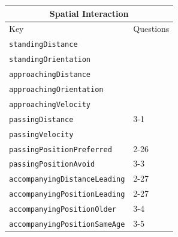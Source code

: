 \documentclass{CSSRforAfrica}
\begin{document}
\begin{table}[H]
\begin{center}
\begin{tabular}{|l l|}
\hline \hline
\multicolumn{2}{|c|}{{\small \bf Spatial Interaction}} \\
\hline \hline
 {\small Key  }                                         &  {\small  Questions }      \\
\hline
{\footnotesize \verb+standingDistance+} 	           &{\footnotesize \verb++} \vspace{-1mm}\\
{\footnotesize \verb+standingOrientation+} 	           &  {\footnotesize \verb++} \vspace{-1mm}\\
{\footnotesize \verb+approachingDistance+} 	   &  {\footnotesize \verb++} \vspace{-1mm}\\
{\footnotesize \verb+approachingOrientation+} 	   & {\footnotesize \verb++} \vspace{-1mm}\\
{\footnotesize \verb+approachingVelocity+} 	           & {\footnotesize \verb++} \vspace{-1mm}\\
{\footnotesize \verb+passingDistance+} 	           &{\footnotesize 3-1} \vspace{-1mm}\\
{\footnotesize \verb+passingVelocity+} 	                  & {\footnotesize \verb++} \vspace{-1mm}\\
{\footnotesize \verb+passingPositionPreferred+} 	    & {\footnotesize 2-26} \vspace{-1mm}\\
{\footnotesize \verb+passingPositionAvoid+} 	    & {\footnotesize 3-3} \vspace{-1mm}\\
{\footnotesize \verb+accompanyingDistanceLeading+} 	   & {\footnotesize 2-27} \vspace{-1mm}\\
{\footnotesize \verb+accompanyingPositionLeading+} 	         & {\footnotesize 2-27 \verb++} \vspace{-1mm}\\
{\footnotesize \verb+accompanyingPositionOlder+} 	         & {\footnotesize 3-4\verb++} \vspace{-1mm}\\
{\footnotesize \verb+accompanyingPositionSameAge+} 	   & {\footnotesize 3-5\verb++} \vspace{-1mm}\\

\end{tabular}
\end{center}
\end{table}
\end{document}
